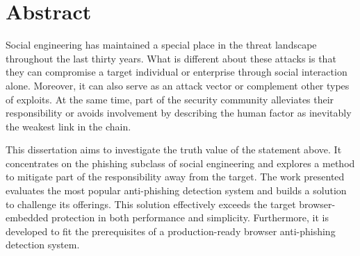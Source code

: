 \chapter*{Abstract}
Social engineering has maintained a special place in the threat landscape throughout the last thirty years. What is different about these attacks is that they can compromise a target individual or enterprise through social interaction alone. Moreover, it can also serve as an attack vector or complement other types of exploits.
At the same time, part of the security community alleviates their responsibility or avoids involvement by describing the human factor as inevitably the weakest link in the chain.

This dissertation aims to investigate the truth value of the statement above. It concentrates on the phishing subclass of social engineering and explores a method to mitigate part of the responsibility away from the target. The work presented evaluates the most popular anti-phishing detection system and builds a solution to challenge its offerings. This solution effectively exceeds the target browser-embedded protection in both performance and simplicity. Furthermore, it is developed to fit the prerequisites of a production-ready browser anti-phishing detection system.
